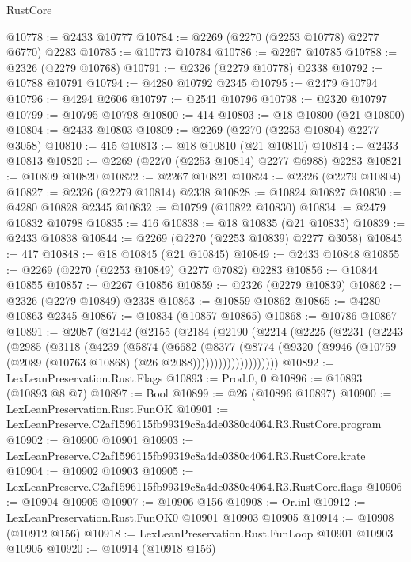\begin{lexlean}{RustCore}
\begin{coremodule}
@10778 := @2433 @10777
@10784 := @2269 (@2270 (@2253 @10778) @2277 @6770) @2283
@10785 := @10773 @10784
@10786 := @2267 @10785
@10788 := @2326 (@2279 @10768)
@10791 := @2326 (@2279 @10778) @2338
@10792 := @10788 @10791
@10794 := @4280 @10792 @2345
@10795 := @2479 @10794
@10796 := @4294 @2606
@10797 := @2541 @10796
@10798 := @2320 @10797
@10799 := @10795 @10798
@10800 := 414
@10803 := @18 @10800 (@21 @10800)
@10804 := @2433 @10803
@10809 := @2269 (@2270 (@2253 @10804) @2277 @3058)
@10810 := 415
@10813 := @18 @10810 (@21 @10810)
@10814 := @2433 @10813
@10820 := @2269 (@2270 (@2253 @10814) @2277 @6988) @2283
@10821 := @10809 @10820
@10822 := @2267 @10821
@10824 := @2326 (@2279 @10804)
@10827 := @2326 (@2279 @10814) @2338
@10828 := @10824 @10827
@10830 := @4280 @10828 @2345
@10832 := @10799 (@10822 @10830)
@10834 := @2479 @10832 @10798
@10835 := 416
@10838 := @18 @10835 (@21 @10835)
@10839 := @2433 @10838
@10844 := @2269 (@2270 (@2253 @10839) @2277 @3058)
@10845 := 417
@10848 := @18 @10845 (@21 @10845)
@10849 := @2433 @10848
@10855 := @2269 (@2270 (@2253 @10849) @2277 @7082) @2283
@10856 := @10844 @10855
@10857 := @2267 @10856
@10859 := @2326 (@2279 @10839)
@10862 := @2326 (@2279 @10849) @2338
@10863 := @10859 @10862
@10865 := @4280 @10863 @2345
@10867 := @10834 (@10857 @10865)
@10868 := @10786 @10867
@10891 := @2087
    (@2142
      (@2155
        (@2184
          (@2190
            (@2214
              (@2225
                (@2231
                  (@2243
                    (@2985
                      (@3118
                        (@4239
                          (@5874
                            (@6682
                              (@8377
                                (@8774
                                  (@9320
                                    (@9946
                                      (@10759 (@2089 (@10763 @10868) (@26 @2088))))))))))))))))))))
@10892 := LexLeanPreservation.Rust.Flags
@10893 := Prod.{0, 0}
@10896 := @10893 (@10893 @8 @7)
@10897 := Bool
@10899 := @26 (@10896 @10897)
@10900 := LexLeanPreservation.Rust.FunOK
@10901 := LexLeanPreserve.C2af1596115fb99319c8a4de0380c4064.R3.RustCore.program
@10902 := @10900 @10901
@10903 := LexLeanPreserve.C2af1596115fb99319c8a4de0380c4064.R3.RustCore.krate
@10904 := @10902 @10903
@10905 := LexLeanPreserve.C2af1596115fb99319c8a4de0380c4064.R3.RustCore.flags
@10906 := @10904 @10905
@10907 := @10906 @156
@10908 := Or.inl
@10912 := LexLeanPreservation.Rust.FunOK0 @10901 @10903 @10905
@10914 := @10908 (@10912 @156)
@10918 := LexLeanPreservation.Rust.FunLoop @10901 @10903 @10905
@10920 := @10914 (@10918 @156)

\end{coremodule}
\end{lexlean}
